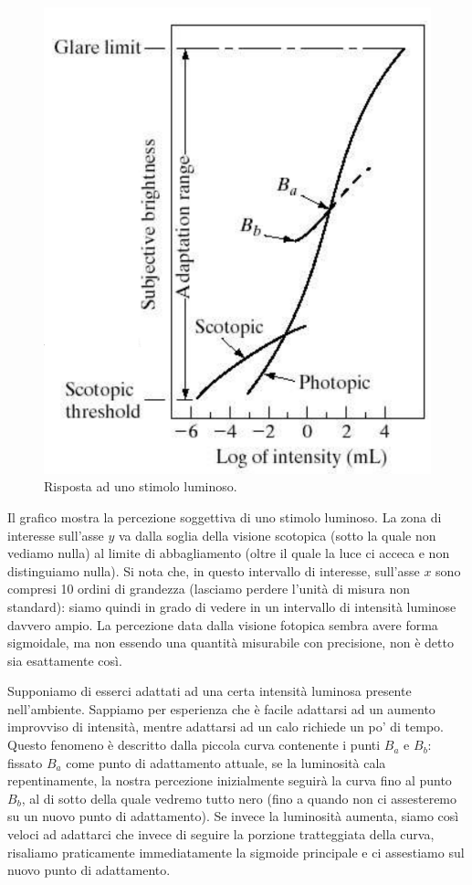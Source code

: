 \documentclass[a4paper,11pt]{article}
\begin{document}
\renewcommand{\thefigure}{2.5}
\begin{figure}[!h]
  \centering
    \includegraphics[scale=0.3]{images/2/response_stimulus.png}
    \caption{Risposta ad uno stimolo luminoso.}
\end{figure}

Il grafico mostra la percezione soggettiva di uno stimolo luminoso. La zona di interesse sull'asse $y$ va dalla soglia della visione scotopica
(sotto la quale non vediamo nulla) al limite di abbagliamento (oltre il quale la luce ci acceca e non distinguiamo nulla).
Si nota che, in questo intervallo di interesse, sull'asse $x$ sono compresi 10 ordini di grandezza (lasciamo perdere l'unità di misura non standard):
siamo quindi in grado di vedere in un intervallo di intensità luminose davvero ampio. La percezione data dalla visione fotopica sembra avere forma sigmoidale, ma non essendo una quantità misurabile
con precisione, non è detto sia esattamente così.
\par
Supponiamo di esserci adattati ad una certa intensità luminosa presente nell'ambiente. Sappiamo per esperienza che è facile
adattarsi ad un aumento improvviso di intensità, mentre adattarsi ad un calo richiede un po' di tempo. Questo fenomeno è descritto
dalla piccola curva contenente i punti $B_a$ e $B_b$: fissato $B_a$ come punto di adattamento attuale, se la luminosità cala
repentinamente, la nostra percezione inizialmente seguirà la curva fino al punto $B_b$, al di sotto della quale vedremo tutto nero
(fino a quando non ci assesteremo su un nuovo punto di adattamento). Se invece la luminosità aumenta, siamo così veloci ad adattarci
che invece di seguire la porzione tratteggiata della curva, risaliamo praticamente immediatamente la sigmoide principale e ci assestiamo sul nuovo punto di adattamento.
\end{document}
